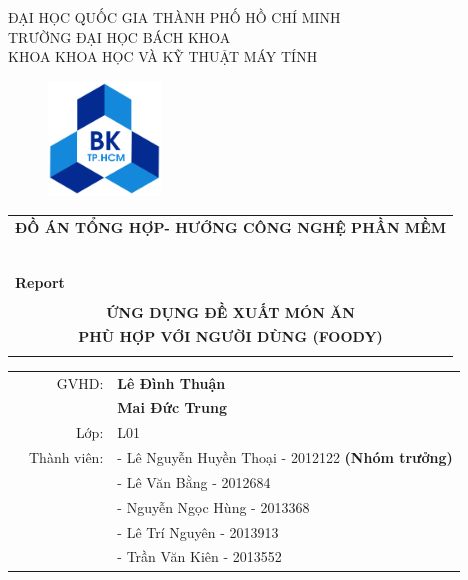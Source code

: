 
\graphicspath{{\subfix{../images/}}}
\begin{titlepage}

\begin{center}
    \large
    ĐẠI HỌC QUỐC GIA THÀNH PHỐ HỒ CHÍ MINH \\
    TRƯỜNG ĐẠI HỌC BÁCH KHOA \\
    KHOA KHOA HỌC VÀ KỸ THUẬT MÁY TÍNH \\
\end{center}

\vspace{1cm}

\begin{figure}[h!]
\begin{center}
\includegraphics[width=3cm]{images/hcmut.png}
\end{center}
\end{figure}

\vspace{1cm}


\begin{center}
\begin{tabular}{c}
\multicolumn{1}{l}{\textbf{{\Large ĐỒ ÁN TỔNG HỢP- HƯỚNG CÔNG NGHỆ PHẦN MỀM}}}\\
~~\\
\hline
\\
\multicolumn{1}{l}{\textbf{{\Large Report}}}\\
\\
\textbf{\Large ỨNG DỤNG ĐỀ XUẤT MÓN ĂN} \\ \textbf{\Large PHÙ HỢP VỚI NGƯỜI DÙNG (FOODY)}\\
\\
\hline
\end{tabular}
\end{center}

\vspace{3cm}

\begin{table}[h]
\begin{tabular}{rrl}

\hspace{5 cm} & GVHD: &\textbf{Lê Đình Thuận} \\
& & \textbf{Mai Đức Trung} \\
& Lớp: &L01 \\
& Thành viên: & - Lê Nguyễn Huyền Thoại - 2012122 \textbf{(Nhóm trưởng)} \\
& &  - Lê Văn Bằng - 2012684\\
& &  - Nguyễn Ngọc Hùng - 2013368 \\
& &  - Lê Trí Nguyên - 2013913 \\
& &  - Trần Văn Kiên - 2013552 \\


\end{tabular}
\end{table}
\end{titlepage}
